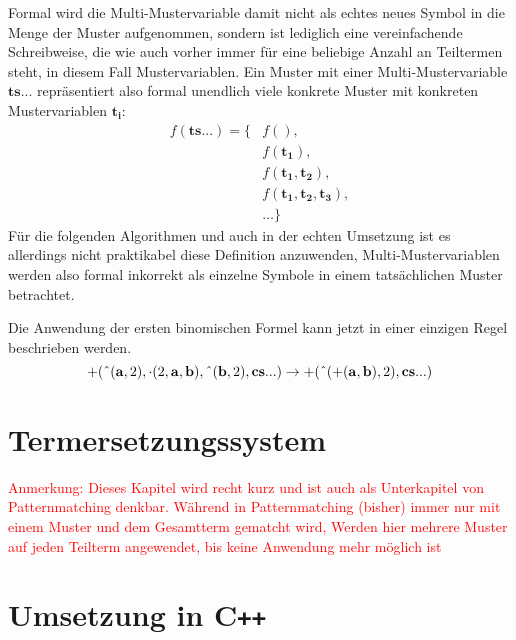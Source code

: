\documentclass{scrartcl}
\numberwithin{figure}{section} %
\theoremstyle{definition} %
\begin{document}
Formal wird die Multi-Mustervariable damit nicht als echtes neues Symbol in die Menge der Muster aufgenommen, sondern ist lediglich eine vereinfachende Schreibweise, die wie auch vorher immer für eine beliebige Anzahl an Teiltermen steht, in diesem Fall Mustervariablen. Ein Muster mit einer Multi-Mustervariable $\mathbf{ts...}$ repräsentiert also formal unendlich viele konkrete Muster mit konkreten Mustervariablen $\mathbf{t_i}$:
\begin{equation*}
    \begin{split}
    		f(\mathbf{ts...}) = \{&f(), \\
    		&f(\mathbf{t_1}),\\
    		&f(\mathbf{t_1}, \mathbf{t_2}), \\
    		&f(\mathbf{t_1}, \mathbf{t_2}, \mathbf{t_3}), \\
    		&\dots \}    		
    \end{split}
\end{equation*}
Für die folgenden Algorithmen und auch in der echten Umsetzung ist es allerdings nicht praktikabel diese Definition anzuwenden, Multi-Mustervariablen werden also formal inkorrekt als einzelne Symbole in einem tatsächlichen Muster betrachtet.

Die Anwendung der ersten binomischen Formel kann jetzt in einer einzigen Regel beschrieben werden.
$$+(\string^(\mathbf a, 2), \cdot(2, \mathbf a, \mathbf b), \string^(\mathbf b, 2), \mathbf{cs...}) \rightarrow +(\string^(+(\mathbf a, \mathbf b), 2), \mathbf{cs...})$$

\section{Termersetzungssystem}
\textcolor{red} {
\begin{itshape}
Anmerkung: Dieses Kapitel wird recht kurz und ist auch als Unterkapitel von Patternmatching denkbar. 
Während in Patternmatching (bisher) immer nur mit einem Muster und dem Gesamtterm gematcht wird, Werden hier mehrere Muster auf jeden Teilterm angewendet, bis keine Anwendung mehr möglich ist
\end{itshape}
}

\section{Umsetzung in C\texttt{++}} \label {secUmsetzungInCpp}
\end{document}
